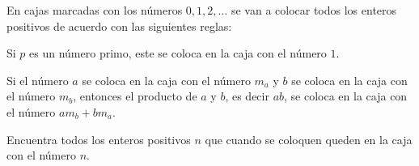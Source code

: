 En cajas marcadas con los números $0,1,2,\dots$ se van a colocar todos los enteros positivos de acuerdo con las siguientes reglas:

Si $p$ es un número primo, este se coloca en la caja con el número $1$. 

Si el número $a$ se coloca en la caja con el número $m_a$ y $b$ se coloca en la caja con el número $m_b$, entonces el producto de $a$ y $b$, es decir $ab$, se coloca en la caja con el número $am_b+bm_a$.

Encuentra todos los enteros positivos $n$ que cuando se coloquen queden en la caja con el número $n$.